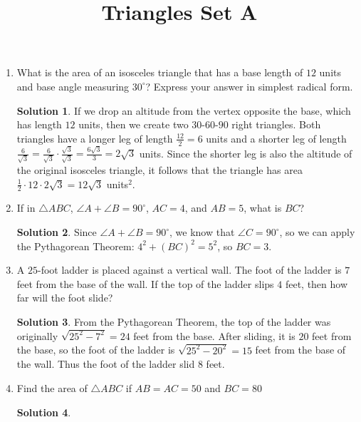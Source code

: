 \documentclass{article}
\title{Triangles Set A}
\date{}
\author{}
\theoremstyle{definition}
\newtheorem*{solution}{Solution}
\begin{document}
\maketitle

\begin{multicols}{2}
    \begin{enumerate}
        \item What is the area of an isosceles triangle that has a base length of $12$ units and base angle measuring $30^{\circ}$?
            Express your answer in simplest radical form.
            \begin{solution}
               If we drop an altitude from the vertex opposite the base, which has length $12$ units, then we create two $30$-$60$-$90$ right triangles.
               Both triangles have a longer leg of length $\frac{12}{2} = 6$ units and a shorter leg of length $\frac{6}{\sqrt{3}} = \frac{6}{\sqrt{3}} \cdot \frac{\sqrt{3}}{\sqrt{3}} = \frac{6\sqrt{3}}{3} = 2\sqrt{3}$ units.
               Since the shorter leg is also the altitude of the original isosceles triangle, it follows that the triangle has area $\frac{1}{2} \cdot 12 \cdot 2\sqrt{3} = 12\sqrt{3}$ units$^{2}$.
            \end{solution}
        \item If in $\triangle ABC$, $\angle A + \angle B = 90^{\circ}$, $AC = 4$, and $AB = 5$, what is $BC$?
            \begin{solution}
                Since $\angle A + \angle B = 90^{\circ}$, we know that $\angle C = 90^{\circ}$, so we can apply the Pythagorean Theorem: $4^2 + (BC)^2 = 5^2$, so $BC = 3$.
            \end{solution}
        \item A $25$-foot ladder is placed against a vertical wall.
            The foot of the ladder is $7$ feet from the base of the wall.
            If the top of the ladder slips $4$ feet, then how far will the foot slide?
            \begin{solution}
                From the Pythagorean Theorem, the top of the ladder was originally $\sqrt{25^2 - 7^2} = 24$ feet from the base.
                After sliding, it is $20$ feet from the base, so the foot of the ladder is $\sqrt{25^2 - 20^2} = 15$ feet from the base of the wall.
                Thus the foot of the ladder slid $8$ feet.
            \end{solution}
        \item Find the area of $\triangle ABC$ if $AB = AC = 50$ and $BC = 80$
            \begin{solution}

\end{solution}
\end{enumerate}
\end{multicols}
\end{document}

